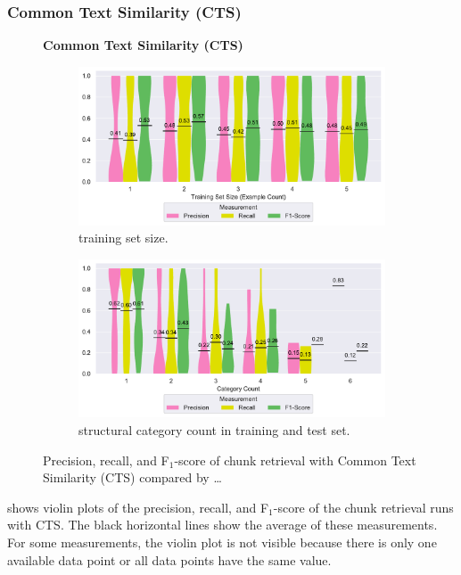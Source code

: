 \subsubsection{Common Text Similarity (CTS)}
\label{sec:r:cts}

\begin{figure}
\centering
    \textbf{Common Text Similarity (CTS)}\par\medskip
\begin{subfigure}[tb]{\columnwidth}
		\centering
		\includegraphics[width=0.8\columnwidth,
		clip]{img/big-study/recall-precision-examplecount-CTS.pdf}
		\caption{training set size.}
		\label{fig:recall-precision-examplecount-CTS}

\end{subfigure}\hspace{\fill}
\begin{subfigure}[tb]{\columnwidth}
		\centering
				\includegraphics[width=0.8\columnwidth,
				clip]{img/big-study/recall-precision-categorycount-CTS.pdf}
		\caption{structural category count
		in training and test set.}
		\label{fig:recall-precision-categorycount-CTS}
\end{subfigure}
\caption{Precision, recall, and F$_{1}$-score of chunk
retrieval with Common Text Similarity (CTS) compared by \ldots}
\label{fig:results-CTS}
\end{figure}

 shows violin plots
of the precision,
recall, and F$_{1}$-score of the chunk retrieval runs with CTS.
The black horizontal lines show the average of these measurements.
For some measurements, the violin plot is not visible because there is
only one available data point or all data points have the same value.


